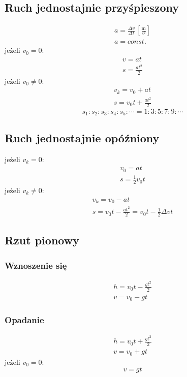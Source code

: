 \documentclass{article}
\numberwithin{equation}{section}
\newcommand{\unit}[1]{\, \left[\mathrm{#1}\right]}
\begin{document}
    \subsection{Ruch jednostajnie przyśpieszony}
      \begin{gather}
        a = \frac{\Delta v}{\Delta t} \unit{\frac{m}{s^2}}\\
        a = const.
      \end{gather}
      jeżeli $v_0 = 0$:
      \begin{gather}
        v = at\\
        s = \frac{at^2}{2}
      \end{gather}
      jeżeli $v_0 \ne 0$:
      \begin{gather}
        v_k = v_0 + at\\
        s = v_0t + \frac{at^2}{2}
      \end{gather}
      \begin{equation}
        s_1:s_2:s_3:s_4:s_5:\cdots = 1:3:5:7:9:\cdots
      \end{equation}
    \subsection{Ruch jednostajnie opóźniony}
      jeżeli $v_k = 0$:
      \begin{gather}
        v_0 = at\\
        s = \frac{1}{2}v_0t
      \end{gather}
      jeżeli $v_k \ne 0$:
      \begin{gather}
        v_k = v_0 - at\\
        s = v_0t - \frac{at^2}{2} = v_0t - \frac{1}{2}\Delta vt
      \end{gather}
    \subsection{Rzut pionowy}
      \subsubsection{Wznoszenie się}
        \begin{gather}
          h = v_0t - \frac{gt^2}{2}\\
          v = v_0 - gt
        \end{gather}
      \subsubsection{Opadanie}
        \begin{gather}
          h = v_0t + \frac{gt^2}{2}\\
          v = v_0 + gt
        \end{gather}
        jeżeli $v_0 = 0$:
        \begin{equation}
          v = gt
        \end{equation}
\end{document}
